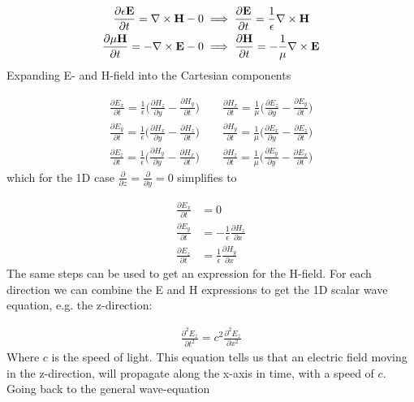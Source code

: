 \begin{align}
  \frac{\partial \epsilon \bold{E}}{\partial t} = \nabla \times \bold{H} - 0 & \implies \frac{\partial \bold{E}}{\partial t} = \frac{1}{\epsilon} \nabla \times \bold{H} \\
\frac{\partial \mu \bold{H}}{\partial t} =  - \nabla \times \bold{E} - 0 & \implies \frac{\partial \bold{H}}{\partial t} = - \frac{1}{\mu} \nabla \times \bold{E}
\end{align}
Expanding E- and H-field into the Cartesian components 

\begin{align}
  \frac{\partial E_x}{\partial t} = \frac{1}{\epsilon} \big(\frac{\partial H_z}{\partial y} - \frac{\partial H_y}{\partial t} \big) \qquad  
  \frac{\partial H_x}{\partial t} = \frac{1}{\mu} \big(\frac{\partial E_z}{\partial y} - \frac{\partial E_y}{\partial t} \big)\\
  \frac{\partial E_y}{\partial t} = \frac{1}{\epsilon} \big(\frac{\partial H_x}{\partial y} - \frac{\partial H_z}{\partial t} \big) \qquad 
  \frac{\partial H_y}{\partial t} = \frac{1}{\mu} \big(\frac{\partial E_x}{\partial y} - \frac{\partial E_z}{\partial t} \big) \\
  \frac{\partial E_z}{\partial t} = \frac{1}{\epsilon} \big(\frac{\partial H_y}{\partial y} - \frac{\partial H_x}{\partial t} \big) \qquad 
  \frac{\partial H_z}{\partial t} = \frac{1}{\mu} \big(\frac{\partial E_y}{\partial y} - \frac{\partial E_x}{\partial t} \big)
\end{align}
which for the 1D case $\frac{\partial}{\partial z} = \frac{\partial}{\partial y} = 0$ simplifies to 

\begin{align}
  \frac{\partial E_x}{\partial t} &= 0 \\
  \frac{\partial E_y}{\partial t} &= - \frac{1}{\epsilon} \frac{\partial H_z}{\partial x}\\
  \frac{\partial E_z}{\partial t} &= \frac{1}{\epsilon} \frac{\partial H_y}{\partial x}
\end{align}
The same steps can be used to get an expression for the H-field. For each direction we can combine the E and H expressions to get the 1D scalar wave equation, e.g. the z-direction: 

\begin{align}
  \frac{\partial^2 E_z}{\partial t^2} = c^2 \frac{\partial^2 E_z}{\partial x^2}
\end{align}
Where $c$ is the speed of light. This equation tells us that an electric field moving in the z-direction, will propagate along the x-axis in time, with a speed of $c$. Going back to the general wave-equation 

